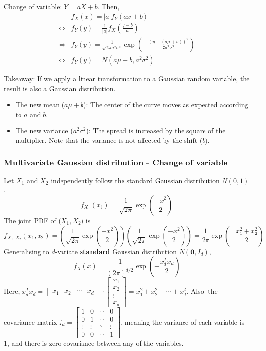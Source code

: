 \documentclass[../Probability.tex]{subfiles}
\begin{document}
\noindent Change of variable: $Y = aX + b$. Then,
\begin{align*}
    & f_X(x) = |a| f_Y(ax + b) \\
    \iff & f_Y(y) = \frac{1}{|a|} f_X \left( \frac{y - b}{a} \right) \\
    \iff & f_Y(y) = \frac{1}{\sqrt{2\pi a^2 \sigma^2}} \exp(-\frac{(y - (a\mu + b))^2}{2a^2 \sigma^2}) \\
    \iff & f_Y(y) = N(a\mu + b, a^2 \sigma^2)
\end{align*}

\noindent Takeaway: If we apply a linear transformation to a Gaussian random variable,
the result is also a Gaussian distribution.
\begin{itemize}
    \item The new mean ($a\mu + b$): The center of the curve moves as expected according to $a$ and $b$.
    \item The new variance ($a^2\sigma^2$): The spread is increased by the square of the multiplier.\newline
    Note that the variance is not affected by the shift ($b$).
\end{itemize}

\subsubsection{Multivariate Gaussian distribution - Change of variable}
Let $X_1$ and $X_2$ independently follow the standard Gaussian distribution $N(0,1)$.
\[f_{X_1}(x_1)=\frac{1}{\sqrt{2\pi}}\exp(\frac{-x^2}{2})\]
The joint PDF of ($X_1,X_2$) is 
\[f_{X_1,X_2}(x_1,x_2)=(\frac{1}{\sqrt{2\pi}}\exp(\frac{-x^2}{2}))(\frac{1}{\sqrt{2\pi}}\exp(\frac{-x^2}{2}))=\frac{1}{2\pi}\exp(-\frac{x_1^2+x_2^2}{2})\]
Generalising to $d$-variate \textbf{standard} Gaussian distribution $N(\mathbf{0},I_d)$,
\[f_X(x)=\frac{1}{(2\pi)^{d/2}}\exp(-\frac{x_d^Tx_d}{2})\]
Here, $x_d^Tx_d = \begin{bmatrix}
    x_1 & x_2 & \cdots & x_d
\end{bmatrix} \cdot \begin{bmatrix}
    x_1 \\ x_2 \\ \vdots \\ x_d
\end{bmatrix} = x_1^2 + x_2^2 + \cdots + x_d^2$.\newline
Also, the covariance matrix $I_d = \begin{bmatrix}
    1 & 0 & \cdots & 0 \\
    0 & 1 & \cdots & 0 \\
    \vdots & \vdots & \ddots & \vdots \\
    0 & 0 & \cdots & 1
\end{bmatrix}$, meaning the variance of each variable is 1, and there is zero covariance between any of the variables.
\end{document}
